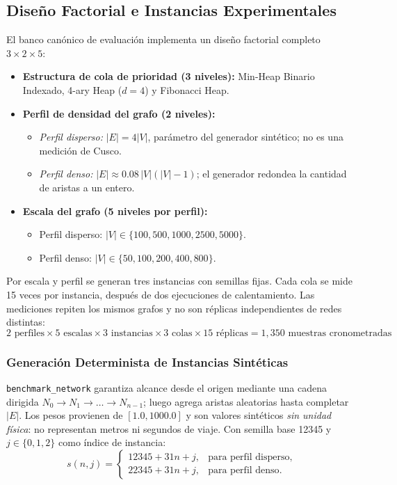 \subsection{Diseño Factorial e Instancias Experimentales}
El banco canónico de evaluación implementa un diseño factorial completo $3 \times 2 \times 5$:
\begin{itemize}
    \item \textbf{Estructura de cola de prioridad (3 niveles):} Min-Heap Binario Indexado, 4-ary Heap ($d=4$) y Fibonacci Heap.
    \item \textbf{Perfil de densidad del grafo (2 niveles):}
    \begin{itemize}
        \item \textit{Perfil disperso:} $|E| = 4|V|$, parámetro del generador sintético; no es una medición de Cusco.
        \item \textit{Perfil denso:} $|E| \approx 0.08 \, |V|(|V| - 1)$; el generador redondea la cantidad de aristas a un entero.
    \end{itemize}
    \item \textbf{Escala del grafo (5 niveles por perfil):}
    \begin{itemize}
        \item Perfil disperso: $|V| \in \{100, 500, 1000, 2500, 5000\}$.
        \item Perfil denso: $|V| \in \{50, 100, 200, 400, 800\}$.
    \end{itemize}
\end{itemize}

Por escala y perfil se generan tres instancias con semillas fijas. Cada cola se mide 15 veces por instancia, después de dos ejecuciones de calentamiento. Las mediciones repiten los mismos grafos y no son réplicas independientes de redes distintas:
\begin{equation}
    2 \text{ perfiles} \times 5 \text{ escalas} \times 3 \text{ instancias} \times 3 \text{ colas} \times 15 \text{ réplicas} = 1,350 \text{ muestras cronometradas}
    \label{eq:muestras}
\end{equation}

\subsubsection{Generación Determinista de Instancias Sintéticas}
\texttt{benchmark\_network} garantiza alcance desde el origen mediante una cadena dirigida $N_0 \to N_1 \to \dots \to N_{n-1}$; luego agrega aristas aleatorias hasta completar $|E|$. Los pesos provienen de $[1.0,1000.0]$ y son valores sintéticos \emph{sin unidad física}: no representan metros ni segundos de viaje. Con semilla base 12345 y $j\in\{0,1,2\}$ como índice de instancia:
\begin{equation}
    s(n, j) = \begin{cases}
        12345 + 31n + j, & \text{para perfil disperso}, \\
        22345 + 31n + j, & \text{para perfil denso}.
    \end{cases}
    \label{eq:semillas}
\end{equation}

